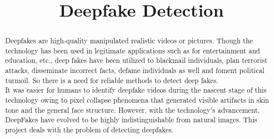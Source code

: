 \documentclass[conference]{IEEEtran}
\begin{document}
    \title{Deepfake Detection\\
    }
    
    \author{
        
        \and
    
        
        \and
        
        
        \and
        
    }
    
    \maketitle
    
    \begin{abstract}
        Deepfakes are high-quality manipulated realistic videos or pictures. Though the technology has been used in legitimate applications such as for entertainment and education, etc., deep fakes have been utilized to blackmail individuals, plan terrorist attacks, disseminate incorrect facts, defame individuals as well and foment political turmoil. So there is a need for reliable methods to detect deep fakes. \\
    
        It was easier for humans to identify deepfake videos during the nascent stage of this technology owing to pixel collapse phenomena that generated visible artifacts in skin tone and the general face structure. However, with the technology’s advancement, DeepFakes have evolved to be highly indistinguishable from natural images. This project deals with the problem of detecting deepfakes.
    
    \end{abstract}
    
\end{document}
